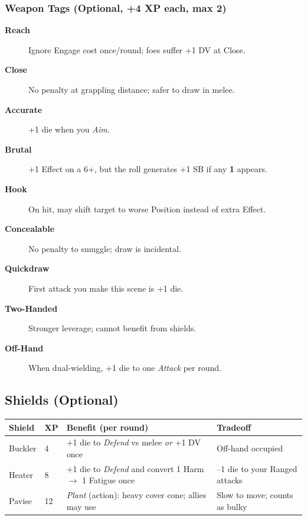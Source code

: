 \subsubsection{Weapon Tags (Optional, +4 XP each, max 2)}
\begin{description}
    \item[\textbf{Reach}] Ignore Engage cost once/round; foes suffer +1 DV at Close.
    \item[\textbf{Close}] No penalty at grappling distance; safer to draw in melee.
    \item[\textbf{Accurate}] +1 die when you \emph{Aim}.
    \item[\textbf{Brutal}] +1 Effect on a 6+, but the roll generates +1 SB if any \textbf{1} appears.
    \item[\textbf{Hook}] On hit, may shift target to worse Position instead of extra Effect.
    \item[\textbf{Concealable}] No penalty to smuggle; draw is incidental.
    \item[\textbf{Quickdraw}] First attack you make this scene is +1 die.
    \item[\textbf{Two-Handed}] Stronger leverage; cannot benefit from shields.
    \item[\textbf{Off-Hand}] When dual‑wielding, +1 die to one \emph{Attack} per round.
\end{description}

\subsection{Shields (Optional)}
\begin{center}
\begin{longtable}{llll}
\toprule
\textbf{Shield} & \textbf{XP} & \textbf{Benefit (per round)} & \textbf{Tradeoff} \\
\midrule
Buckler & 4 & +1 die to \emph{Defend} vs melee \emph{or} +1 DV once & Off‑hand occupied \\
Heater  & 8 & +1 die to \emph{Defend} and convert 1 Harm $\rightarrow$ 1 Fatigue once & --1 die to your Ranged attacks \\
Pavise  & 12 & \emph{Plant} (action): heavy cover cone; allies may use & Slow to move; counts as bulky \\
\bottomrule
\end{longtable}
\end{center}

